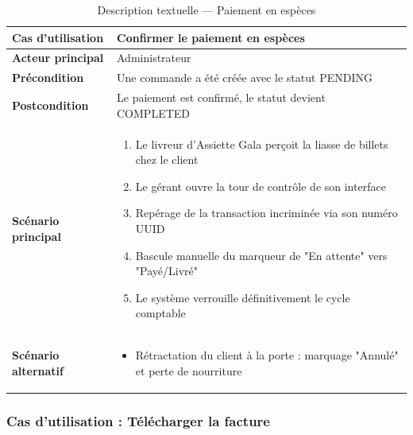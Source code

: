\begin{table}[H]
    \centering
    \caption{Description textuelle --- Paiement en espèces}
    \label{tab:desc_paiement}
    \renewcommand{\arraystretch}{1.3}
    \begin{tabular}{|p{4cm}|p{8.5cm}|}
        \hline
        \textbf{Cas d'utilisation} & Confirmer le paiement en espèces \\
        \hline
        \textbf{Acteur principal} & Administrateur \\
        \hline
        \textbf{Précondition} & Une commande a été créée avec le statut PENDING \\
        \hline
        \textbf{Postcondition} & Le paiement est confirmé, le statut devient COMPLETED \\
        \hline
        \textbf{Scénario principal} &
        \begin{enumerate}
            \item Le livreur d'Assiette Gala perçoit la liasse de billets chez le client
            \item Le gérant ouvre la tour de contrôle de son interface
            \item Repérage de la transaction incriminée via son numéro UUID
            \item Bascule manuelle du marqueur de "En attente" vers "Payé/Livré"
            \item Le système verrouille définitivement le cycle comptable
        \end{enumerate} \\
        \hline
        \textbf{Scénario alternatif} &
        \begin{itemize}
            \item[1a.] Rétractation du client à la porte : marquage "Annulé" et perte de nourriture
        \end{itemize} \\
        \hline
    \end{tabular}
\end{table}

\subsubsection{Cas d'utilisation : Télécharger la facture}

